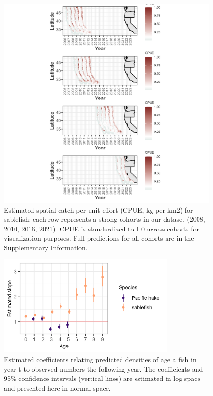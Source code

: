\documentclass[
]{article}
\begin{document}
\begin{figure}

{\centering \includegraphics[width=6.2in,height=\textheight]{plots/sablefish-follow-age-class.png}

}

\caption{\label{fig-sablefish-spatial-composition}Estimated spatial
catch per unit effort (CPUE, kg per km2) for sablefish; each row
represents a strong cohorts in our dataset (2008, 2010, 2016, 2021).
CPUE is standardized to 1.0 across cohorts for visualization purposes.
Full predictions for all cohorts are in the Supplementary Information.}

\end{figure}

\newpage

\begin{figure}

{\centering \includegraphics[width=3.5in,height=\textheight]{plots/glm_coefficients.png}

}

\caption{\label{fig-glm-coefficients}Estimated coefficients relating
predicted densities of age a fish in year t to observed numbers the
following year. The coefficients and 95\% confidence intervals (vertical
lines) are estimated in log space and presented here in normal space.}

\end{figure}
\end{document}
